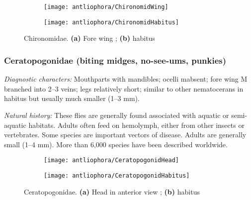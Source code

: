\begin{figure}[ht!]
    \centering
    \begin{subfigure}[ht!]{0.45\textwidth}
        \texttt{[image: antliophora/ChironomidWing]}
        \caption{}
        \label{fig:chiron1}
    \end{subfigure}
    \qquad 
    \begin{subfigure}[ht!]{0.45\textwidth}
        \texttt{[image: antliophora/ChironomidHabitus]}
        \caption{}
        \label{fig:chiron2}
    \end{subfigure}
    \caption{Chironomidae. \textbf{(a)} Fore wing \citep[][Fig. 29.9]{mcalpine1981manual}; \textbf{(b)} habitus \citep[][Fig. 29.1]{mcalpine1981manual}}\label{fig:chironomids}
\end{figure}

\subsubsection{Ceratopogonidae (biting midges, no-see-ums, punkies)}
\noindent{}\textit{Diagnostic characters:} Mouthparts with mandibles; ocelli mabsent; fore wing M branched into 2--3 veins; legs relatively short; similar to other nematocerans in habitus but usually much smaller (1--3 mm). \vspace{3mm}

\noindent{}\textit{Natural history:} These flies are generally found associated with aquatic or semi-aquatic habitats. Adults often feed on hemolymph, either from other insects or vertebrates. Some species are important vectors of disease. Adults are generally small (1--4 mm). More than 6,000 species have been described worldwide.  

\begin{figure}[ht!]
    \centering
    \begin{subfigure}[ht!]{0.35\textwidth}
        \texttt{[image: antliophora/CeratopogonidHead]}
        \caption{}
        \label{fig:ceratopogonid1}
    \end{subfigure}
    \qquad 
    \begin{subfigure}[ht!]{0.5\textwidth}
        \texttt{[image: antliophora/CeratopogonidHabitus]}
        \caption{}
        \label{fig:ceratopogonid2}
    \end{subfigure}
    \caption{Ceratopogonidae. \textbf{(a)} Head in anterior view \citep[][Fig. 28.4]{mcalpine1981manual}; \textbf{(b)} habitus \citep[][Fig. 28.13]{mcalpine1981manual}}\label{fig:ceratopogonids}
\end{figure}

